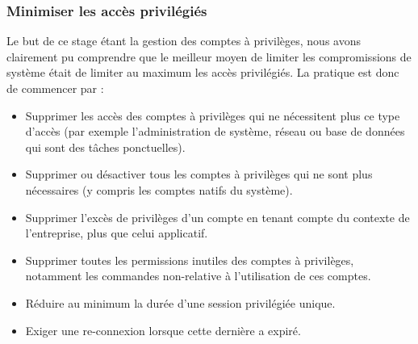 \subsubsection{Minimiser les accès privilégiés}
\label{par:minipriv}

Le but de ce stage étant la gestion des comptes à privilèges, nous avons clairement pu comprendre que le meilleur moyen de limiter les compromissions de système était de limiter au maximum les accès privilégiés. La pratique est donc de commencer par :
\begin{itemize}
	\item Supprimer les accès des comptes à privilèges qui ne nécessitent plus ce type d'accès (par exemple l'administration de système, réseau ou base de données qui sont des tâches ponctuelles).
	\item Supprimer ou désactiver tous les comptes à privilèges qui ne sont plus nécessaires (y compris les comptes natifs du système).
	\item Supprimer l'excès de privilèges d'un compte en tenant compte du contexte de l'entreprise, plus que celui applicatif.
	\item Supprimer toutes les permissions inutiles des comptes à privilèges, notamment les commandes non-relative à l'utilisation de ces comptes.
	\item Réduire au minimum la durée d'une session privilégiée unique.
	\item Exiger une re-connexion lorsque cette dernière a expiré.
\end{itemize}

